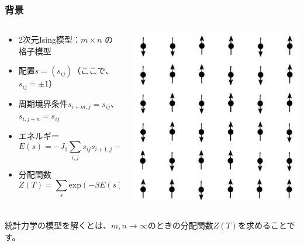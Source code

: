 \documentclass{beamer}
\begin{document}
\begin{frame}
    \frametitle{背景}

    \begin{columns}[c]
        \begin{column}{0.7\linewidth}
            \begin{itemize}
                \item 2次元Ising模型：\(m \times n\) の格子模型
                \item 配置$s=(s_{ij})$（ここで、$s_{ij}=\pm 1$）
                \item 周期境界条件$s_{i+m,j}=s_{ij}$、$s_{i,j+n}=s_{ij}$
                \item エネルギー
                      \begin{equation}
                          E(s)=-J_1\sum_{i,j}s_{ij}s_{i+1,j}-J_2\sum_{i,j}s_{ij}s_{i,j+1}
                      \end{equation}
                \item 分配関数
                      \begin{equation}
                          Z(T)=\sum_{s}\mathrm{exp}(-βE(s))
                      \end{equation}
            \end{itemize}
        \end{column}
        \begin{column}{0.3\linewidth}
            \includegraphics[width=\linewidth]{images/ising.jpeg}
        \end{column}
    \end{columns}

    \bigskip

    統計力学の模型を解くとは、$m,n→∞$のときの分配関数$Z(T)$を求めることです。
\end{frame}
\end{document}

